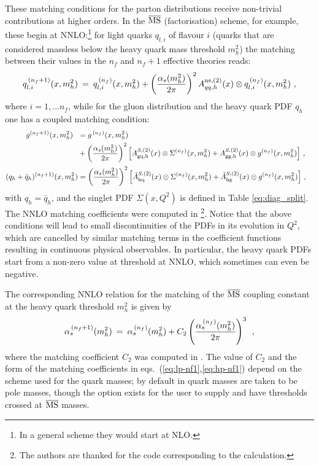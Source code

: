 These matching conditions for the parton distributions
receive non-trivial contributions at higher orders. In the $\overline{\mathrm{MS}}$
(factorisation) scheme, for example, these begin at NNLO:\footnote{In
  a general scheme they would start at NLO.} %
for light quarks $q_{l,i}$ of flavour $i$ 
(quarks that are considered massless
below the heavy quark mass threshold $m_h^2$) the matching between
their values in the $n_f$ and
$n_f+1$ effective theories reads:
\begin{equation}
\label{eq:lp-nf1}
  q_{l,i}^{\,(n_f+1)}(x,m_h^2) \: = \:  q_{l,i}^{\,(n_f)}(x,m_h^2) +
\left( \frac{\alpha_s(m_h^2)}{2\pi} \right)^2
   A^{\rm ns,(2)}_{qq,h}(x) \otimes
  q_{l,i}^{\, (n_f)}(x,m_h^2) \ ,
\end{equation}
where  $i = 1,\ldots n_f$, while for the gluon
distribution and the heavy quark PDF $q_h$ one has a coupled matching 
condition:
\begin{align}
\label{eq:hp-nf1}
  g^{(n_f+1)}(x,m_h^2) \:\:\: &=
    g^{\, (n_f)}(x,m_h^2) 
\\ &+ \left( \frac{\alpha_s(m_h^2)}{2\pi} \right)^2 \Big[
    A_{\rm gq,h}^{S,(2)}(x) \otimes \Sigma^{(n_f)}(x,m_h^2) +
    A_{\rm gg,h}^{S,(2)}(x) \otimes g^{(n_f)}(x,m_h^2) \Big ]\ ,
  \nonumber \\[0.5mm] 
  (q_h+\bar{q}_{h})^{(n_f+1)}(x,m_h^2)  &=
   \left( \frac{\alpha_s(m_h^2)}{2\pi} \right)^2 \Big [
    \tilde{A}_{\rm hq}^{S,(2)}(x)\otimes \Sigma^{(n_f)}(x,m_h^2) 
    + \tilde{A}_{\rm hg}^{S,(2)}(x)\otimes g^{(n_f)}(x,m_h^2) \Big  ] \ ,
  \quad \nonumber
\end{align}
with $q_h=\bar{q}_h$, and the singlet PDF $\Sigma(x,Q^2)$ is defined
in Table \ref{eq:diag_split}.
The NNLO matching coefficients were
computed in \cite{NNLO-MTM}\footnote{The authors are thanked 
for the code corresponding to the
calculation.}.
Notice that the above conditions will lead to small discontinuities
of the PDFs in its evolution in $Q^2$, 
which are cancelled by similar matching terms
in the coefficient functions resulting in continuous physical
observables. In particular, the heavy quark PDFs start from a non-zero
value at threshold at NNLO, which sometimes can even be
negative.

The corresponding NNLO relation for the matching of the $\overline{\mathrm{MS}}$
coupling constant at the heavy quark threshold $m^2_h$ is given by 
\begin{equation}
\label{eq:as-nf1}
  \alpha_s^{\, (n_f+1)}(m_h^2) \: = \:
  \alpha_s^{\, (n_f)} (m_h^2) +   C_2 \left( \frac{\alpha_s^{\, (n_f)} (m_h^2)}{2\pi} \right)^3
   \:\: ,
\end{equation}
where the matching coefficient $C_2$ was computed in \cite{Chetyrkin:1997sg}.
%
The value of $C_2$ and the form of the matching coefficients in
eqs.~(\ref{eq:lp-nf1},\ref{eq:hp-nf1}) depend on the scheme used for
the quark masses; by default in \hoppet quark masses are taken to be
pole masses, though the option exists for the user to supply and have
thresholds crossed at $\overline{\mathrm{MS}}$ masses.

